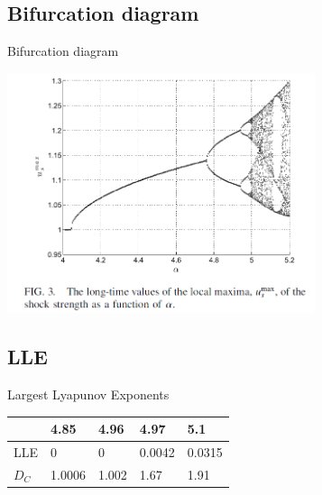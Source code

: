\documentclass{beamer}
\begin{document}
\subsection{Bifurcation diagram}
\begin{frame}{Bifurcation diagram}
	\begin{center}
		\includegraphics[height=200pt]{map}\\
		
	\end{center}	
\end{frame}
\subsection{LLE}
\begin{frame}{Largest Lyapunov Exponents}
\begin{center}
	\begin{tabular}{ | l | l | l | l |l |}
		\hline
		 & 4.85 & 4.96 & 4.97 & 5.1 \\ \hline
		LLE & 0 & 0 & 0.0042 & 0.0315\\ \hline
		$D_C$ & 1.0006 & 1.002 & 1.67 & 1.91   \\
		\hline
	\end{tabular}
\end{center}
\end{frame}
\end{document}
